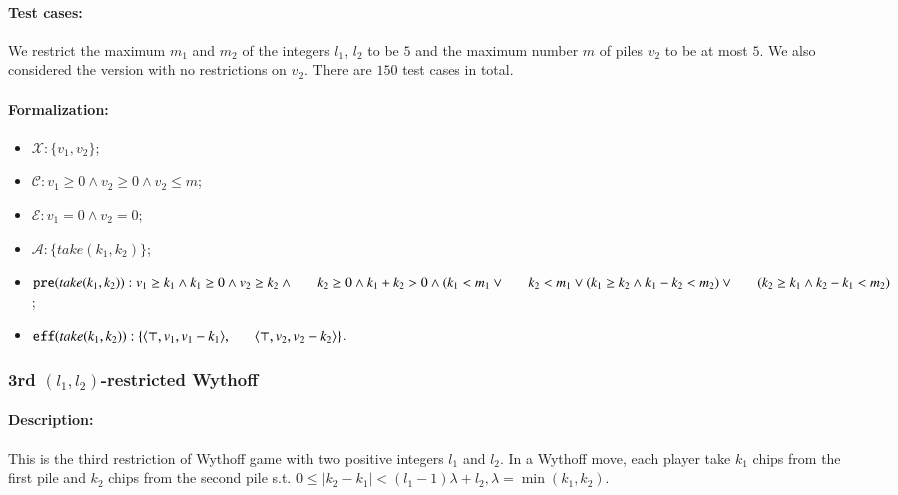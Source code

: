 \documentclass[review]{elsarticle}
\newcommand{\set}[1]{\{ #1 \}}
\newcommand{\tuple}[1]{\langle {#1} \rangle}
\newcommand{\true}{\top}
\newcommand{\statevar}{\mathcal{X}}
\newcommand{\act}{\mathcal{A}}
\newcommand{\constraint}{\mathcal{C}}
\newcommand{\estate}{\mathcal{E}}
\newcommand{\pre}{\mathtt{pre}}
\newcommand{\eff}{\mathtt{eff}}
\begin{document}
\paragraph{Test cases:}
We restrict the maximum $m_1$ and $m_2$ of the integers $l_1$, $l_2$ to be $5$ and the maximum number $m$ of piles $v_2$ to be at most $5$.
We also considered the version with no restrictions on $v_2$.
There are $150$ test cases in total.


\paragraph{Formalization:}
\begin{itemize}
	\item $\statevar:\set{v_1, v_2}$;
	\item $\constraint: v_1 \ge 0 \wedge v_2 \ge 0 \wedge v_2 \le m$;
	\item $\estate: v_1 = 0 \wedge v_2 = 0$;
	\item $\act:\set{take(k_1, k_2)}$;
	\item $\pre(take(k_1, k_2)) : v_1 \ge k_1 \wedge  k_1 \ge 0 \wedge v_2 \ge k_2 \wedge \\ \hspace*{6mm}
	k_2 \ge 0 \wedge  k_1 + k_2 > 0 \wedge ( k_1 < m_1 \vee \\ \hspace*{6mm}
	k_2 < m_1 \vee (k_1\ge k_2 \wedge k_1 - k_2 < m_2) \vee \\ 	\hspace*{6mm}
	(k_2\ge k_1 \wedge k_2 - k_1 < m_2) $;
	\item $\eff(take(k_1, k_2)) : \set{\tuple{\true, v_1, v_1 -k_1}, \\ \hspace*{6mm}
		\tuple{\true, v_2, v_2 - k_2}}$.
\end{itemize}



\subsubsection{3rd $(l_1,l_2)$-restricted Wythoff \protect\cite{LiuL2014}}

\paragraph{Description:}
This is the third restriction of Wythoff game with two positive integers $l_1$ and $l_2$.
In a Wythoff move, each player take $k_1$ chips from the first pile and $k_2$ chips from the second pile s.t. $0 \le |k_2 - k_1| < (l_1 - 1) \lambda + l_2, \lambda = \min (k_1, k_2)$.
\end{document}
